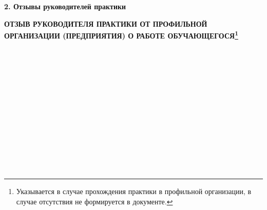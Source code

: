 \documentclass[12pt,a4paper]{scrartcl}
\begin{document}
	\newpage
	
	\begin{center}
		\textbf{2. Отзывы руководителей практики}
	\end{center}
		\begin{center}
			\textbf{ОТЗЫВ РУКОВОДИТЕЛЯ ПРАКТИКИ ОТ ПРОФИЛЬНОЙ ОРГАНИЗАЦИИ (ПРЕДПРИЯТИЯ) О РАБОТЕ ОБУЧАЮЩЕГОСЯ\footnote{Указывается в случае прохождения практики в профильной организации, в случае отсутствия не формируется в документе.}} \\
			\vspace{0.5cm}
			\noindent
			\underline{\hspace{15cm}} \\
			\vspace{0.3cm}\underline{\hspace{15cm}} \\
			\vspace{0.3cm}\underline{\hspace{15cm}} \\
			\vspace{0.3cm}\underline{\hspace{15cm}} \\
			\vspace{0.3cm}\underline{\hspace{15cm}} \\
			\vspace{0.3cm}\underline{\hspace{15cm}} \\
			\vspace{0.3cm}\underline{\hspace{15cm}} \\
			\vspace{0.3cm}\underline{\hspace{15cm}} \\
			\vspace{0.3cm}\underline{\hspace{15cm}} \\
			\vspace{0.3cm}\underline{\hspace{15cm}} \\
			\vspace{0.3cm}\underline{\hspace{15cm}} \\
			\vspace{0.3cm}\underline{\hspace{15cm}} \\
			\vspace{0.3cm}\underline{\hspace{15cm}} \\

\end{center}
\end{document}
